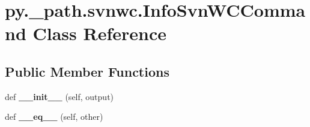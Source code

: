 \hypertarget{classpy_1_1__path_1_1svnwc_1_1_info_svn_w_c_command}{}\section{py.\+\_\+path.\+svnwc.\+Info\+Svn\+W\+C\+Command Class Reference}
\label{classpy_1_1__path_1_1svnwc_1_1_info_svn_w_c_command}
\subsection*{Public Member Functions}
\begin{DoxyCompactItemize}
\item 
\mbox{\label{classpy_1_1__path_1_1svnwc_1_1_info_svn_w_c_command_a7b4273a15a3cf23ebd62973b18177328}} 
def {\bfseries \+\_\+\+\_\+init\+\_\+\+\_\+} (self, output)
\item 
\mbox{\label{classpy_1_1__path_1_1svnwc_1_1_info_svn_w_c_command_a968fe324fc620fa1c37c9ee2602a8c37}} 
def {\bfseries \+\_\+\+\_\+eq\+\_\+\+\_\+} (self, other)
\end{DoxyCompactItemize}
